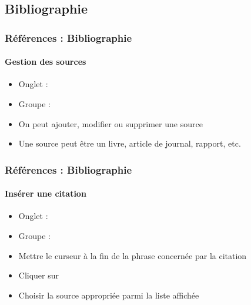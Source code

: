 \documentclass[xcolor=table]{beamer}
\begin{document}
\subsection{Bibliographie}

\begin{frame}[t]
\frametitle{Références : Bibliographie}
\framesubtitle{Gestion des sources}

\begin{minipage}{0.48\textwidth}
	\begin{itemize}
		\item Onglet : 
		\item Groupe : 
		\item On peut ajouter, modifier ou supprimer une source  
		\item Une source peut être un livre, article de journal, rapport, etc.
	\end{itemize}
\end{minipage}
\begin{minipage}{0.50\textwidth}
	
	
	
\end{minipage}

\end{frame}

\begin{frame}[t]
\frametitle{Références : Bibliographie}
\framesubtitle{Insérer une citation}

\begin{minipage}{0.68\textwidth}
	\begin{itemize}
		\item Onglet : 
		\item Groupe : 
		\item Mettre le curseur à la fin de la phrase concernée par la citation
		\item Cliquer sur 
		\item Choisir la source appropriée parmi la liste affichée
	\end{itemize}
\end{minipage}
\begin{minipage}{0.30\textwidth}
	
%	
	
\end{minipage}

\end{frame}
\end{document}
